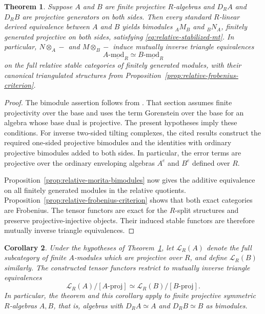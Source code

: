 \documentclass[12pt,a4paper,english,reqno]{amsart}
\numberwithin{equation}{section}
\theoremstyle{plain}
\newtheorem{theorem}{Theorem}[section]
\newtheorem{corollary}[theorem]{Corollary}
\theoremstyle{definition}
\begin{document}
\begin{theorem}
\label{thm:rz-relative-derived-stable}
Suppose $A$ and $B$ are finite projective $R$-algebras and
$D_RA$ and $D_RB$ are projective generators on both sides.
Then every standard $R$-linear derived equivalence between $A$ and $B$
yields bimodules ${}_AM_B$ and ${}_BN_A$, finitely generated projective on both
sides, satisfying \eqref{eq:relative-stabilized-mt}.  In
particular, $N\otimes_A-$ and $M\otimes_B-$ induce mutually
inverse triangle equivalences
\[
 A\text{-}\underline{\mathrm{mod}}_R
   \simeq B\text{-}\underline{\mathrm{mod}}_R
\]
on the full relative stable categories of finitely generated
modules, with their canonical triangulated structures from
Proposition~\ref{prop:relative-frobenius-criterion}.
\end{theorem}

\begin{proof}
The bimodule assertion follows from
\cite[Section~2.6, Proposition~2.14 and Corollary~2.15]{RouquierZimmermann2003}.
That section assumes finite projectivity over the base and uses
the term Gorenstein over the base for an algebra whose
base dual is projective.  The present hypotheses imply these
conditions.  For inverse two-sided tilting complexes, the cited
results construct the required one-sided projective bimodules
and the identities with ordinary projective bimodules added to
both sides.  In particular, the error terms are projective over
the ordinary enveloping algebras $A^e$ and $B^e$ defined over $R$.

Proposition~\ref{prop:relative-morita-bimodules} now gives the
additive equivalence on all finitely generated modules in the
relative quotients.  Proposition~\ref{prop:relative-frobenius-criterion}
shows that both exact categories are Frobenius.  The tensor
functors are exact for the $R$-split structures and preserve
projective-injective objects.  Their induced stable functors
are therefore mutually inverse triangle equivalences.
\end{proof}

\begin{corollary}\label{cor:rz-lattices-and-symmetric-algebras}
Under the hypotheses of
Theorem~\ref{thm:rz-relative-derived-stable}, let $\mathcal L_R(A)$
denote the full subcategory of finite $A$-modules which are
projective over $R$, and define $\mathcal L_R(B)$ similarly.
The constructed tensor functors restrict to mutually inverse
triangle equivalences
\[
 \mathcal L_R(A)/[A\text{-}\mathrm{proj}]
   \simeq \mathcal L_R(B)/[B\text{-}\mathrm{proj}].
\]
In particular, the theorem and this corollary apply to finite
projective symmetric $R$-algebras $A,B$, that is, algebras with
$D_RA\simeq A$ and $D_RB\simeq B$ as bimodules.
\end{corollary}
\end{document}

